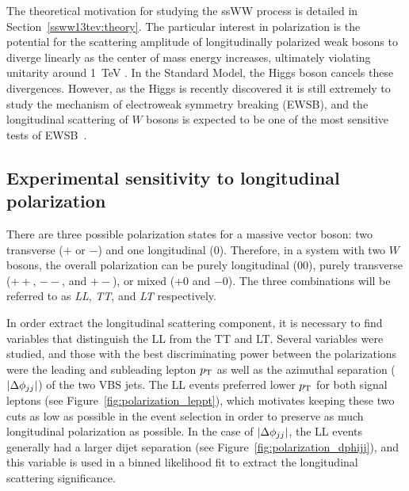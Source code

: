 The theoretical motivation for studying the ssWW process is detailed in Section~\ref{ssww13tev:theory}.
The particular interest in polarization is the potential for the scattering amplitude of longitudinally polarized weak bosons to diverge linearly as the center of mass energy increases, ultimately violating unitarity around 1~TeV \cite{1977.ben-lee-weak-interactions}.
In the Standard Model, the Higgs boson cancels these divergences.
However, as the Higgs is recently discovered it is still extremely to study the mechanism of electroweak symmetry breaking (EWSB), and the longitudinal scattering of $W$ bosons is expected to be one of the most sensitive tests of EWSB~\cite{2013.longitudinal-theory}.


\subsection{Experimental sensitivity to longitudinal polarization}\label{sec:sswwupgrade_longitudinal_sens}
There are three possible polarization states for a massive vector boson: two transverse ($+$ or $-$) and one longitudinal ($0$).
Therefore, in a system with two $W$ bosons, the overall polarization can be purely longitudinal ($00$), purely transverse ($++$, $--$, and $+-$), or mixed ($+0$ and $-0$).
The three combinations will be referred to as \emph{LL}, \emph{TT}, and \emph{LT} respectively.

In order extract the longitudinal scattering component, it is necessary to find variables that distinguish the LL from the TT and LT.
Several variables were studied, and those with the best discriminating power between the polarizations were the leading and subleading lepton $p_{\mathrm{T}}$ as well as the azimuthal separation ($|\Delta\phi_{jj}|$) of the two VBS jets.
The LL events preferred lower $p_{\mathrm{T}}$ for both signal leptons (see Figure~\ref{fig:polarization_leppt}), which motivates keeping these two cuts as low as possible in the event selection in order to preserve as much longitudinal polarization as possible.
In the case of $|\Delta\phi_{jj}|$, the LL events generally had a larger dijet separation (see Figure~\ref{fig:polarization_dphijj}), and this variable is used in a binned likelihood fit to extract the longitudinal scattering significance.

